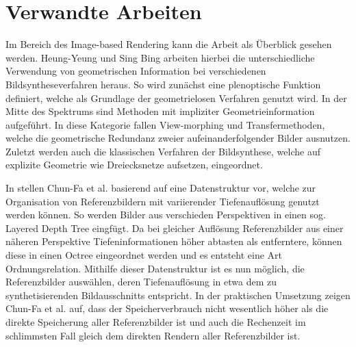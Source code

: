 \documentclass[hyperref, beleg, german]{cgvpub}
\begin{document}
\section{Verwandte Arbeiten}
\label{sec:verwandte_arbeiten}

Im Bereich des Image-based Rendering kann die Arbeit \cite{shum2000review} als
Überblick gesehen werden. Heung-Yeung und Sing Bing arbeiten hierbei die
unterschiedliche Verwendung von geometrischen Information bei verschiedenen
Bildsyntheseverfahren heraus. So wird zunächst eine plenoptische Funktion
definiert, welche als Grundlage der geometrielosen Verfahren genutzt wird. In
der Mitte des Spektrums sind Methoden mit impliziter Geometrieinformation
aufgeführt. In diese Kategorie fallen View-morphing und Transfermethoden, welche
die geometrische Redundanz zweier aufeinanderfolgender Bilder ausnutzen. Zuletzt
werden auch die klassischen Verfahren der Bildsynthese, welche auf explizite
Geometrie wie Dreiecksnetze aufsetzen, eingeordnet.

In \cite{chang1999ldi} stellen Chun-Fa et al. basierend auf \cite{he1998layered}
eine Datenstruktur vor, welche zur Organisation von Referenzbildern mit
variierender Tiefenauflösung genutzt werden können. So werden Bilder aus
verschieden Perspektiven in einen sog. Layered Depth Tree eingfügt. Da bei
gleicher Auflösung Referenzbilder aus einer näheren Perspektive
Tiefeninformationen höher abtasten als entferntere, können diese in einen Octree
eingeordnet werden und es entsteht eine Art Ordnungsrelation. Mithilfe dieser
Datenstruktur ist es nun möglich, die Referenzbilder auswählen, deren
Tiefenauflösung in etwa dem zu synthetisierenden Bildausschnitts entspricht. In
der praktischen Umsetzung zeigen Chun-Fa et al. auf, dass der Speicherverbrauch
nicht wesentlich höher als die direkte Speicherung aller Referenzbilder ist und
auch die Rechenzeit im schlimmsten Fall gleich dem direkten Rendern aller
Referenzbilder ist.
\end{document}
